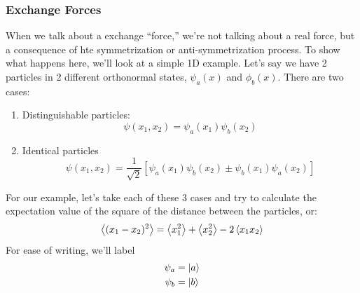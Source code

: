 \documentclass[a4paper]{article}
\begin{document}
\subsubsection{Exchange Forces}
When we talk about a exchange ``force,'' we're not talking about a real force,
but a consequence of hte symmetrization or anti-symmetrization process. To
show what happens here, we'll look at a simple 1D example. Let's say we have
2 particles in 2 different orthonormal states, $\psi_a(x)$ and $\phi_b(x)$.
There are two cases:
\begin{enumerate}
	\item Distinguishable particles:
		\[ \psi(x_1,x_2) = \psi_a(x_1)\psi_b(x_2) \]
	\item Identical particles
		\[ \psi(x_1,x_2) = \frac{1}{\sqrt{2}}[\psi_a(x_1)\psi_b(x_2)
		\pm\psi_b(x_1)\psi_a(x_2)] \] 
\end{enumerate}
For our example, let's take each of these 3 cases and try to calculate the
expectation value of the square of the distance between the particles, or:
\[ \left\langle (x_1-x_2)^2\right\rangle = \left\langle x_1^2\right\rangle+\left\langle x_2^2\right\rangle-2\left\langle x_1x_2\right\rangle\]
For ease of writing, we'll label
\begin{align*}
	\psi_a &= \left\lvert a\right\rangle\\
	\psi_b &= \left\lvert b\right\rangle
\end{align*}
\end{document}
